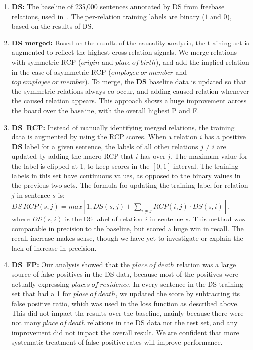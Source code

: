 \begin{enumerate}

\item \textbf{DS:} The baseline of 235,000 sentences annotated by DS from freebase relations, used in~\citet{riedel2013relation}. The per-relation training labels are binary ($1$ and $0$), based on the results of DS.

\item \textbf{DS merged:} Based on the results of the causality analysis, the training set is augmented to reflect the highest cross-relation signals.  We merge relations with symmetric RCP ($origin$ and $place\ of\ birth$), and add the implied relation in the case of asymmetric RCP ($employee\ or\ member$  and $top\ employee\ or\ member$). To merge, the \textbf{DS} baseline data is updated so that the symmetric relations always co-occur, and adding caused relation whenever the caused relation appears. This approach shows a huge improvement across the board over the baseline, with the overall highest P and F.

\item \textbf{DS\ RCP:} Instead of manually identifying merged relations, the training data is augmented by using the RCP scores. When a relation $i$ has a positive \textbf{DS} label for a given sentence, the labels of all other relations $j \neq i$ are updated by adding the macro RCP that $i$ has over $j$. The maximum value for the label is clipped at 1, to keep scores in the $[0,1]$ interval. The training labels in this set have continuous values, as opposed to the binary values in the previous two sets. The formula for updating the training label for relation $j$ in sentence $s$ is: $ DS\ RCP(s, j) = max[1, DS(s, j) + \sum_{i \neq j} RCP(i,j) \cdot DS(s,i) ],$ where $DS(s,i)$ is the DS label of relation $i$ in sentence $s$.  This method was comparable in precision to the baseline, but scored a huge win in recall.  The recall increase makes sense, though we have yet to investigate or explain the lack of increase in precision.

\item \textbf{DS\ FP:} Our analysis showed that the $place\ of\ death$ relation was a large source of false positives in the DS data, because most of the positives were actually expressing $places\ of\ residence$.  In every sentence in the DS training set that had a 1 for $place\ of\ death$, we updated the score by subtracting its false positive ratio, which was used in the loss function as described above.  This did not impact the results over the baseline, mainly because there were not many $place\ of\ death$ relations in the DS data nor the test set, and any improvement did not impact the overall result.  We are confident that more systematic treatment of false positive rates will improve performance.

\end{enumerate}

